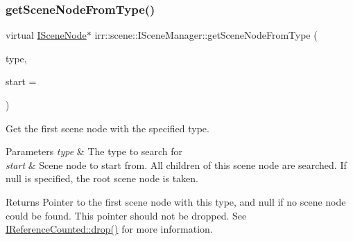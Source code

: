\subsubsection{\texorpdfstring{get\+Scene\+Node\+From\+Type()}{getSceneNodeFromType()}\hspace{0.1cm}{\footnotesize\ttfamily [1/2]}}
{\footnotesize\ttfamily virtual \hyperlink{classirr_1_1scene_1_1ISceneNode}{I\+Scene\+Node}$\ast$ irr\+::scene\+::\+I\+Scene\+Manager\+::get\+Scene\+Node\+From\+Type (\begin{DoxyParamCaption}\item[{\hyperlink{namespaceirr_1_1scene_acad3d7ef92a9807d391ba29120f3b7bd}{scene\+::\+E\+S\+C\+E\+N\+E\+\_\+\+N\+O\+D\+E\+\_\+\+T\+Y\+PE}}]{type,  }\item[{\hyperlink{classirr_1_1scene_1_1ISceneNode}{I\+Scene\+Node} $\ast$}]{start = {} }\end{DoxyParamCaption})\hspace{0.3cm}{\ttfamily [pure virtual]}}



Get the first scene node with the specified type. 


\begin{DoxyParams}{Parameters}
{\em type} & The type to search for \\
\hline
{\em start} & Scene node to start from. All children of this scene node are searched. If null is specified, the root scene node is taken. \\
\hline
\end{DoxyParams}
\begin{DoxyReturn}{Returns}
Pointer to the first scene node with this type, and null if no scene node could be found. This pointer should not be dropped. See \hyperlink{classirr_1_1IReferenceCounted_a03856a09355b89d178090c4a5f738543}{I\+Reference\+Counted\+::drop()} for more information. 
\end{DoxyReturn}
\mbox{\label{classirr_1_1scene_1_1ISceneManager_a5ab8e8f8cc8456a3ea881c75dfe505bb}} 
